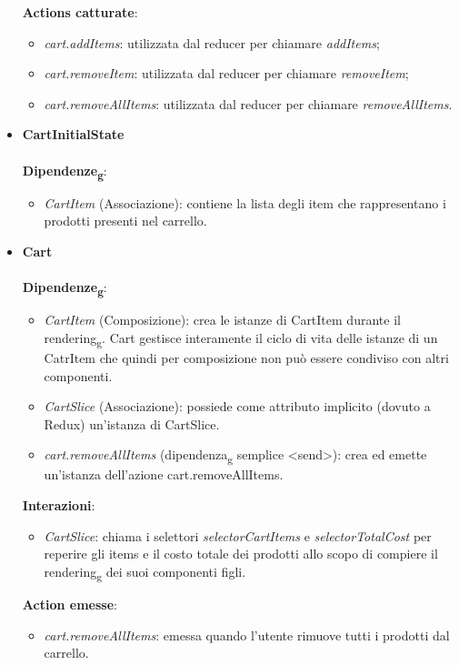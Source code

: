 \begin{itemize}
		\textbf{Actions catturate}:
		\begin{itemize}
			\item \textit{cart.addItems}: utilizzata dal reducer per chiamare \textit{addItems};
			\item \textit{cart.removeItem}: utilizzata dal reducer per chiamare \textit{removeItem};
			\item \textit{cart.removeAllItems}: utilizzata dal reducer per chiamare \textit{removeAllItems}.
		\end{itemize}
		\item \textbf{CartInitialState}
		\\\\
		\textbf{Dipendenze\textsubscript{g}}: 
		\begin{itemize}
			\item \textit{CartItem} (Associazione): contiene la lista degli item che rappresentano i prodotti presenti nel carrello.
		\end{itemize} 
		\item \textbf{Cart}
		\\\\
		\textbf{Dipendenze\textsubscript{g}}:
		\begin{itemize}
		\item \textit{CartItem} (Composizione): crea le istanze di CartItem durante il rendering\textsubscript{g}.
		Cart gestisce interamente il ciclo di vita delle istanze di un CatrItem che quindi per composizione
		non può essere condiviso con altri componenti.
		\item \textit{CartSlice} (Associazione): possiede come attributo implicito (dovuto a Redux) un'istanza di CartSlice.
		\item \textit{cart.removeAllItems} (dipendenza\textsubscript{g} semplice \textless send\textgreater): crea ed emette un'istanza dell'azione cart.removeAllItems.
	\end{itemize} 
	\textbf{Interazioni}:
	\begin{itemize}
		\item \textit{CartSlice}: chiama i selettori \textit{selectorCartItems} e \textit{selectorTotalCost} per reperire gli items e il costo totale dei prodotti 
		allo scopo di compiere il rendering\textsubscript{g} dei suoi componenti figli.
	\end{itemize}
	\textbf{Action emesse}:
	\begin{itemize}
		\item \textit{cart.removeAllItems}: emessa quando l'utente rimuove tutti i prodotti dal carrello.

\end{itemize}
\end{itemize}

